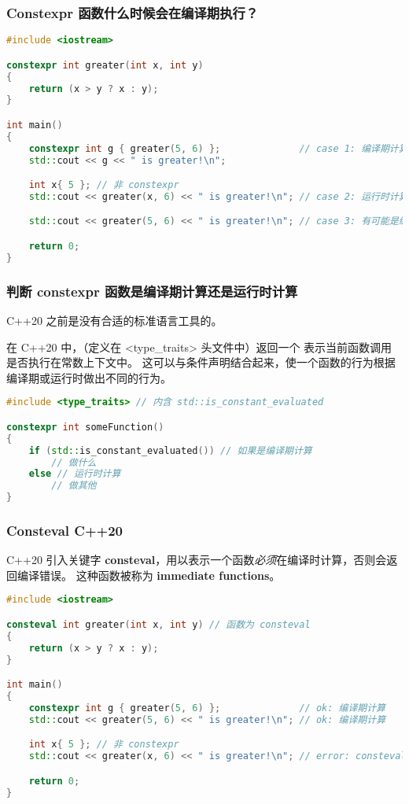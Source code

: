 \documentclass[../../LearnCpp.tex]{subfiles}
\begin{document}
\subsubsection*{Constexpr 函数什么时候会在编译期执行？}

\begin{lstlisting}[language=C++]
#include <iostream>

constexpr int greater(int x, int y)
{
    return (x > y ? x : y);
}

int main()
{
    constexpr int g { greater(5, 6) };              // case 1: 编译期计算
    std::cout << g << " is greater!\n";

    int x{ 5 }; // 非 constexpr
    std::cout << greater(x, 6) << " is greater!\n"; // case 2: 运行时计算

    std::cout << greater(5, 6) << " is greater!\n"; // case 3: 有可能是编译期计算，也有可能是运行时计算，根据编译器优化等级决定

    return 0;
}
\end{lstlisting}

\subsubsection*{判断 constexpr 函数是编译期计算还是运行时计算}

C++20 之前是没有合适的标准语言工具的。

在 C++20 中，（定义在 <type\_traits> 头文件中）返回一个  表示当前函数调用是否执行在常数上下文中。
这可以与条件声明结合起来，使一个函数的行为根据编译期或运行时做出不同的行为。

\begin{lstlisting}[language=C++]
#include <type_traits> // 内含 std::is_constant_evaluated

constexpr int someFunction()
{
    if (std::is_constant_evaluated()) // 如果是编译期计算
        // 做什么
    else // 运行时计算
        // 做其他
}
\end{lstlisting}

\subsubsection*{Consteval C++20}

C++20 引入关键字 \textbf{consteval}，用以表示一个函数\textit{必须}在编译时计算，否则会返回编译错误。
这种函数被称为 \textbf{immediate functions}。

\begin{lstlisting}[language=C++]
#include <iostream>

consteval int greater(int x, int y) // 函数为 consteval
{
    return (x > y ? x : y);
}

int main()
{
    constexpr int g { greater(5, 6) };              // ok: 编译期计算
    std::cout << greater(5, 6) << " is greater!\n"; // ok: 编译期计算

    int x{ 5 }; // 非 constexpr
    std::cout << greater(x, 6) << " is greater!\n"; // error: consteval 函数必须在编译期计算

    return 0;
}
\end{lstlisting}
\end{document}
